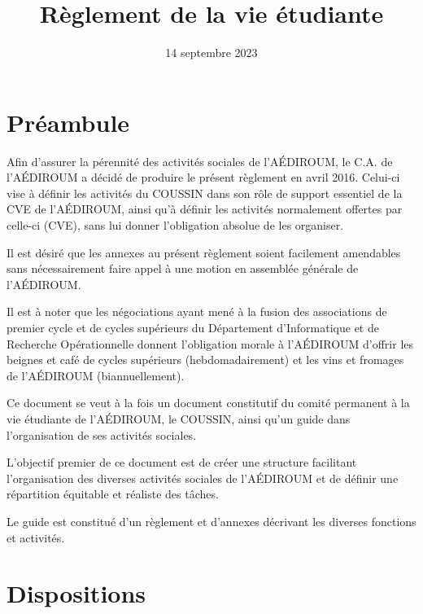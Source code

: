 \documentclass{aediroum}
\title{Règlement de la vie étudiante}
\date{14 septembre 2023}
\begin{document}
\maketitle

\section{Préambule}
Afin d'assurer la pérennité des activités sociales de l'AÉDIROUM, le C.A. de l'AÉDIROUM a décidé de produire le présent règlement en avril 2016. Celui-ci vise à définir les activités du COUSSIN dans son rôle de support essentiel de la CVE de l'AÉDIROUM, ainsi qu'à définir les activités normalement offertes par celle-ci (CVE), sans lui donner l'obligation absolue de les organiser.

Il est désiré que les annexes au présent règlement soient facilement amendables sans nécessairement faire appel à une motion en assemblée générale de l'AÉDIROUM.

Il est à noter que les négociations ayant mené à la fusion des associations de premier cycle et de cycles supérieurs du Département d'Informatique et de Recherche Opérationnelle donnent l'obligation morale à l'AÉDIROUM d'offrir les beignes et café de cycles supérieurs (hebdomadairement) et les vins et fromages de l'AÉDIROUM (biannuellement).

Ce document se veut à la fois un document constitutif du comité permanent à la vie étudiante de l'AÉDIROUM, le COUSSIN, ainsi qu'un guide dans l'organisation de ses activités sociales.

L'objectif premier de ce document est de créer une structure facilitant l'organisation des diverses activités sociales de l'AÉDIROUM et de définir une répartition équitable et réaliste des tâches.

Le guide est constitué d'un règlement et d'annexes décrivant les diverses fonctions et activités.

\section{Dispositions}
\end{document}
